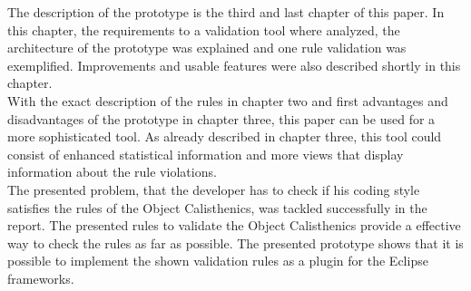 The description of the prototype is the third and last chapter of this paper. In this chapter, the requirements to a validation tool where analyzed, the architecture of the prototype was explained and one rule validation was exemplified. Improvements and usable features were also described shortly in this chapter. 
\\

With the exact description of the rules in chapter two and first advantages and disadvantages of the prototype in chapter three, this paper can be used for a more sophisticated tool. As already described in chapter three, this tool could consist of enhanced statistical information and more views that display information about the rule violations.
\\

The presented problem, that the developer has to check if his coding style satisfies the rules of the Object Calisthenics, was tackled successfully in the report. The presented rules to validate the Object Calisthenics provide a effective way to check the rules as far as possible. The presented prototype shows that it is possible to implement the shown validation rules as a plugin for the Eclipse frameworks.
